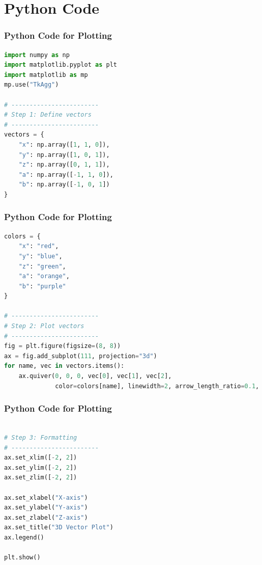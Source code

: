 \documentclass{beamer}
\theoremstyle{remark}
\numberwithin{equation}{section}
\begin{document}
\section{Python Code}
\begin{frame}[fragile]
\frametitle{Python Code for Plotting}
\begin{lstlisting}[language=Python]
import numpy as np
import matplotlib.pyplot as plt
import matplotlib as mp
mp.use("TkAgg")

# ------------------------
# Step 1: Define vectors
# ------------------------
vectors = {
    "x": np.array([1, 1, 0]),
    "y": np.array([1, 0, 1]),
    "z": np.array([0, 1, 1]),
    "a": np.array([-1, 1, 0]),
    "b": np.array([-1, 0, 1])
}

\end{lstlisting}

\end{frame}
\begin{frame}[fragile]
\frametitle{Python Code for Plotting}
\begin{lstlisting}[language=Python]
colors = {
    "x": "red",
    "y": "blue",
    "z": "green",
    "a": "orange",
    "b": "purple"
}

# ------------------------
# Step 2: Plot vectors
# ------------------------
fig = plt.figure(figsize=(8, 8))
ax = fig.add_subplot(111, projection="3d")
for name, vec in vectors.items():
    ax.quiver(0, 0, 0, vec[0], vec[1], vec[2],
              color=colors[name], linewidth=2, arrow_length_ratio=0.1, label=name)

\end{lstlisting}

\end{frame}
\begin{frame}[fragile]
\frametitle{Python Code for Plotting}
\begin{lstlisting}[language=Python]

# Step 3: Formatting
# ------------------------
ax.set_xlim([-2, 2])
ax.set_ylim([-2, 2])
ax.set_zlim([-2, 2])

ax.set_xlabel("X-axis")
ax.set_ylabel("Y-axis")
ax.set_zlabel("Z-axis")
ax.set_title("3D Vector Plot")
ax.legend()

plt.show()

\end{lstlisting}

\end{frame}
\end{document}
